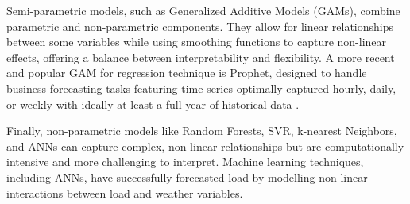 \documentclass[mstat,12pt]{unswthesis}
\begin{document}
Semi-parametric models, such as Generalized Additive Models (GAMs),
combine parametric and non-parametric components. They allow for linear
relationships between some variables while using smoothing functions to
capture non-linear effects, offering a balance between interpretability
and flexibility. A more recent and popular GAM for regression technique
is Prophet, designed to handle business forecasting tasks featuring time
series optimally captured hourly, daily, or weekly with ideally at least
a full year of historical data \cite{taylor2017facebook}.

Finally, non-parametric models like Random Forests, SVR, k-nearest
Neighbors, and ANNs can capture complex, non-linear relationships but
are computationally intensive and more challenging to interpret. Machine
learning techniques, including ANNs, have successfully forecasted load
by modelling non-linear interactions between load and weather variables.
\end{document}
